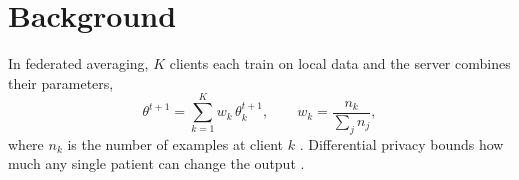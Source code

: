 \chapter{Background}
\label{ch:background}

In federated averaging, $K$ clients each train on local data and the server combines their
parameters,
\begin{equation}
  \theta^{t+1} = \sum_{k=1}^{K} w_k\, \theta_k^{t+1}, \qquad w_k = \frac{n_k}{\sum_j n_j},
  \label{eq:fedavg}
\end{equation}
where $n_k$ is the number of examples at client $k$ \citep{mcmahan2017}. Differential privacy
bounds how much any single patient can change the output \citep{dwork2014}.
